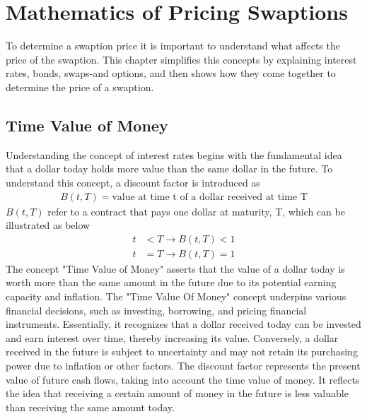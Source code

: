 \section{Mathematics of Pricing Swaptions}
To determine a swaption price it is important to understand what affects the price of the swaption. 
This chapter simplifies this concepts by explaining interest rates, bonds, swaps-and options, 
and then shows how they come together to determine the price of a swaption.
\subsection{Time Value of Money}
Understanding the concept of interest rates begins with the fundamental idea that a dollar today holds 
more value than the same dollar in the future. To understand this concept, a discount factor is introduced as 
\begin{align*}
    B(t,T) = \text{value at time t of a dollar received at time T}
\end{align*} 
$B(t,T)$ refer to a contract that pays one dollar at maturity, T, which can be illustrated as below
\begin{align*}
    t & < T \rightarrow B(t,T) < 1 \\
    t & = T \rightarrow B(t,T) = 1
\end{align*}
The concept "Time Value of Money" asserts that the value of a dollar today is worth more than
the same amount in the future due to its potential earning capacity and inflation.
The "Time Value Of Money" concept underpins various financial decisions, such as investing, borrowing,
and pricing financial instruments. Essentially, it recognizes that a dollar received today can be invested 
and earn interest over time, thereby increasing its value. Conversely, a dollar received in the future
is subject to uncertainty and may not retain its purchasing power due to inflation or other factors.
The discount factor represents the present value of future cash flows, taking into account the time value of money.
It reflects the idea that receiving a certain amount of money in the future is less valuable than receiving 
the same amount today.
